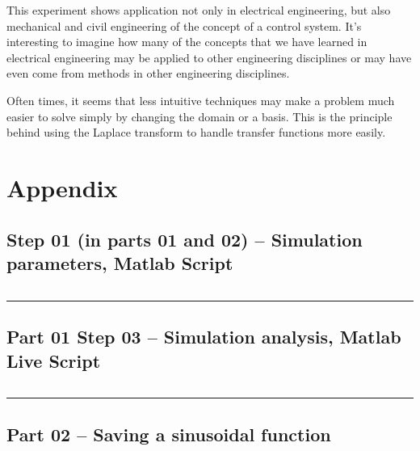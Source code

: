 \documentclass[12pt]{article}
\def\hr{{\par\noindent\rule{\textwidth}{0.4pt}}}
\begin{document}
This experiment shows application not only in electrical engineering, but also mechanical and civil engineering of the concept of a control system.
It's interesting to imagine how many of the concepts that we have learned in electrical engineering may be applied to other engineering disciplines or may have even come from methods in other engineering disciplines.

Often times, it seems that less intuitive techniques may make a problem much easier to solve simply by changing the domain or a basis.
This is the principle behind using the Laplace transform to handle transfer functions more easily.

\newpage
\appendix
\section{Appendix}

\subsection{Step 01 (in parts 01 and 02) -- Simulation parameters, Matlab Script}\label{sap:simulation params}
\inputminted{matlab}{step01_simulation_params.m}

\hr

\subsection{Part 01 Step 03 -- Simulation analysis, Matlab Live Script}\label{sap:simulation analysis mlx}
\inputminted{matlab}{step03_simulation_analysis_mlx.m}

\hr

\subsection{Part 02 -- Saving a sinusoidal function}\label{sap:save sinusoid}
\inputminted{matlab}{part02_save_sinusoid.m}
\end{document}
